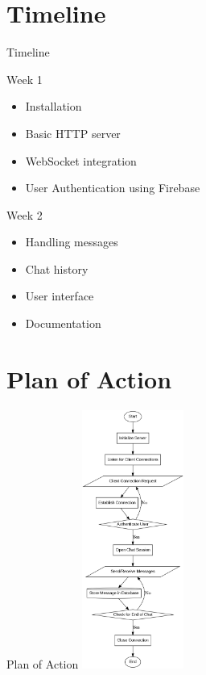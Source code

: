 \documentclass{beamer}
\begin{document}
\section{Timeline}
\begin{frame}{Timeline}
    \begin{block}{Week 1}
        \begin{itemize}
            \item Installation
            \item Basic HTTP server
            \item WebSocket integration
            \item User Authentication using Firebase
        \end{itemize}
    \end{block}
    
    \begin{block}{Week 2}
        \begin{itemize}
            \item Handling messages
            \item Chat history 
            \item User interface
            \item Documentation
        \end{itemize}
    \end{block}
\end{frame}

\section{Plan of Action}
\begin{frame}{Plan of Action}
    \centering
    \includegraphics[width=0.25\textwidth]{Graphviz files/Images/graph.png}
\end{frame}
\end{document}
